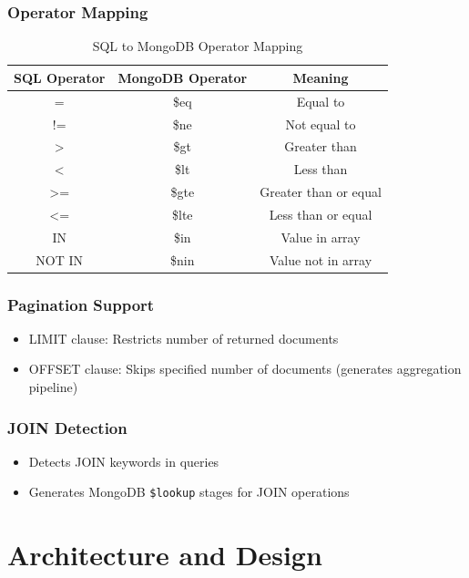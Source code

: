 \documentclass[12pt,a4paper]{article}
\begin{document}
\subsubsection{Operator Mapping}
\begin{table}[H]
    \centering
    \begin{tabular}{|c|c|c|}
        \hline
        \textbf{SQL Operator} & \textbf{MongoDB Operator} & \textbf{Meaning} \\
        \hline
        = & \$eq & Equal to \\
        != & \$ne & Not equal to \\
        > & \$gt & Greater than \\
        < & \$lt & Less than \\
        >= & \$gte & Greater than or equal \\
        <= & \$lte & Less than or equal \\
        IN & \$in & Value in array \\
        NOT IN & \$nin & Value not in array \\
        \hline
    \end{tabular}
    \caption{SQL to MongoDB Operator Mapping}
    \label{tab:operator-mapping}
\end{table}

\subsubsection{Pagination Support}
\begin{itemize}
    \item LIMIT clause: Restricts number of returned documents
    \item OFFSET clause: Skips specified number of documents (generates aggregation pipeline)
\end{itemize}

\subsubsection{JOIN Detection}
\begin{itemize}
    \item Detects JOIN keywords in queries
    \item Generates MongoDB \texttt{\$lookup} stages for JOIN operations
\end{itemize}

\newpage

\section{Architecture and Design}
\end{document}
